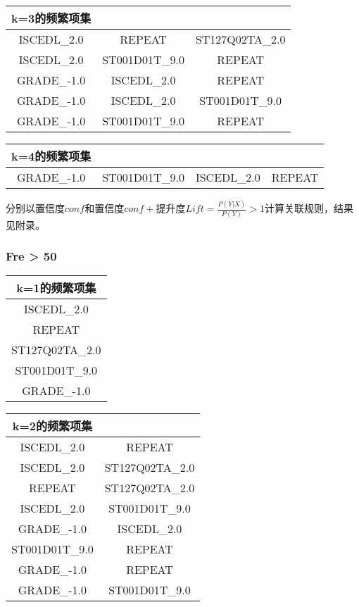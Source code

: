 \documentclass[12pt, a4paper, oneside]{ctexart}
\begin{document}
\begin{table}[h]
    \centering
    \begin{tabular}{ccc}
    \toprule
    k=3的频繁项集                                     \\
    \midrule
    ISCEDL\_2.0&REPEAT&ST127Q02TA\_2.0\\
    ISCEDL\_2.0&ST001D01T\_9.0&REPEAT\\
    GRADE\_-1.0&ISCEDL\_2.0&REPEAT\\
    GRADE\_-1.0&ISCEDL\_2.0&ST001D01T\_9.0\\
    GRADE\_-1.0&ST001D01T\_9.0&REPEAT\\
    \bottomrule
    \end{tabular}
\end{table}
\begin{table}[h]
    \centering
    \begin{tabular}{cccc}
    \toprule
    k=4的频繁项集                                     \\
    \midrule
    GRADE\_-1.0&ST001D01T\_9.0&ISCEDL\_2.0&REPEAT\\
    \bottomrule
    \end{tabular}
\end{table}
\clearpage
分别以置信度$conf$和置信度$conf + $提升度$Lift = \frac{P(Y | X)}{P(Y)} > 1$计算关联规则，结果见附录。
\subsubsection{Fre > 50}
\begin{table}[h]
    \centering
    \begin{tabular}{c}
    \toprule
    k=1的频繁项集                                     \\
    \midrule
    ISCEDL\_2.0\\
    REPEAT\\
    ST127Q02TA\_2.0\\
    ST001D01T\_9.0\\
    GRADE\_-1.0\\
    \bottomrule
    \end{tabular}
\end{table}

\begin{table}[h]
    \centering
    \begin{tabular}{cc}
    \toprule
    k=2的频繁项集                                     \\
    \midrule
    ISCEDL\_2.0& REPEAT\\
    ISCEDL\_2.0&ST127Q02TA\_2.0\\
    REPEAT&ST127Q02TA\_2.0\\
    ISCEDL\_2.0&ST001D01T\_9.0\\
    GRADE\_-1.0&ISCEDL\_2.0\\
    ST001D01T\_9.0&REPEAT\\
    GRADE\_-1.0&REPEAT\\
    GRADE\_-1.0&ST001D01T\_9.0\\
    \bottomrule
    \end{tabular}
\end{table}
\end{document}
